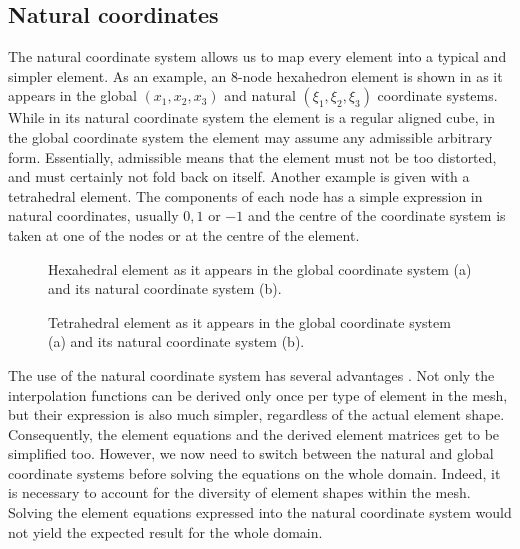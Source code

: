 	\subsection{Natural coordinates}
The natural coordinate system allows us to map every element into a typical and simpler element. As an example, an 8-node hexahedron element is shown in  as it appears in the global $(x_1, x_2, x_3)$ and natural $(\xi_1,\xi_2,\xi_3)$ coordinate systems. While in its natural coordinate system the element is a regular aligned cube, in the global coordinate system the element may assume any admissible arbitrary form. Essentially, admissible means that the element must not be too distorted, and must certainly not fold back on itself. Another example is given  with a tetrahedral element. The components of each node has a simple expression in natural coordinates, usually $0, 1$ or $-1$ and the centre of the coordinate system is taken at one of the nodes or at the centre of the element. 
%
\begin{figure}[ht]
\centering 
{}
\hspace{1cm}
\caption[Natural coordinates of a hexaedron]{Hexahedral element as it appears in the global coordinate system (a) and its natural coordinate system (b).}
\label{chap3:fig-naturalCoordinatesHexa}
\end{figure}
%
\begin{figure}[ht]
\centering 
{}
\hspace{1cm}
\caption[Natural coordinates of a tetrahedron]{Tetrahedral element as it appears in the global coordinate system (a) and its natural coordinate system (b).}
\label{chap3:fig-naturalCoordinatesTetra}
\end{figure}


The use of the natural coordinate system has several advantages \citep{Biswas76}. Not only the interpolation functions can be derived only once per type of element in the mesh, but their expression is also much simpler, regardless of the actual element shape. Consequently, the element equations and the derived element matrices get to be simplified too. However, we now need to switch between the natural and global coordinate systems before solving the equations on the whole domain. Indeed, it is necessary to account for the diversity of element shapes within the mesh. Solving the element equations expressed into the natural coordinate system would not yield the expected result for the whole domain. 
	
